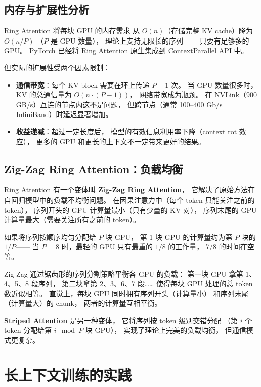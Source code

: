 \subsection{内存与扩展性分析}

Ring Attention 将每块 GPU 的内存需求
从 $O(n)$（存储完整 KV cache）降为 $O(n/P)$
（$P$ 是 GPU 数量），
理论上支持无限长的序列——
只要有足够多的 GPU。
PyTorch 已经将 Ring Attention 原生集成到
ContextParallel API 中。

但实际的扩展性受两个因素限制：
\begin{itemize}[noitemsep]
  \item \textbf{通信带宽}：每个 KV block 需要在环上传递 $P-1$ 次。
        当 GPU 数量很多时，KV 的总通信量为 $O(n \cdot (P-1))$，
        网络带宽成为瓶颈。
        在 NVLink（900 GB/s）互连的节点内这不是问题，
        但跨节点（通常 100--400 Gb/s InfiniBand）时延迟显著增加。
  \item \textbf{收益递减}：超过一定长度后，
        模型的有效信息利用率下降（context rot 效应），
        更多的 GPU 和更长的上下文不一定带来更好的结果。
\end{itemize}

\subsection{Zig-Zag Ring Attention：负载均衡}

Ring Attention 有一个变体叫 \textbf{Zig-Zag Ring Attention}，
它解决了原始方法在自回归模型中的负载不均衡问题。
在因果注意力中（每个 token 只能关注之前的 token），
序列开头的 GPU 计算量最小（只有少量的 KV 对），
序列末尾的 GPU 计算量最大（需要关注所有之前的 token）。

如果将序列按顺序均匀分配给 $P$ 块 GPU，
第 1 块 GPU 的计算量约为第 $P$ 块的 $1/P$——
当 $P = 8$ 时，最轻的 GPU 只有最重的 $1/8$ 的工作量，
7/8 的时间在空等。

Zig-Zag 通过锯齿形的序列分割策略平衡各 GPU 的负载：
第一块 GPU 拿第 1、4、5、8 段序列，
第二块拿第 2、3、6、7 段……
使得每块 GPU 处理的总 token 数近似相等。
直觉上，每块 GPU 同时拥有序列开头（计算量小）
和序列末尾（计算量大）的 chunk，
两者的计算量互相平衡。

\textbf{Striped Attention} 是另一种变体，
它将序列按 token 级别交错分配
（第 $i$ 个 token 分配给第 $i \mod P$ 块 GPU），
实现了理论上完美的负载均衡，
但通信模式更复杂。

\section{长上下文训练的实践}


